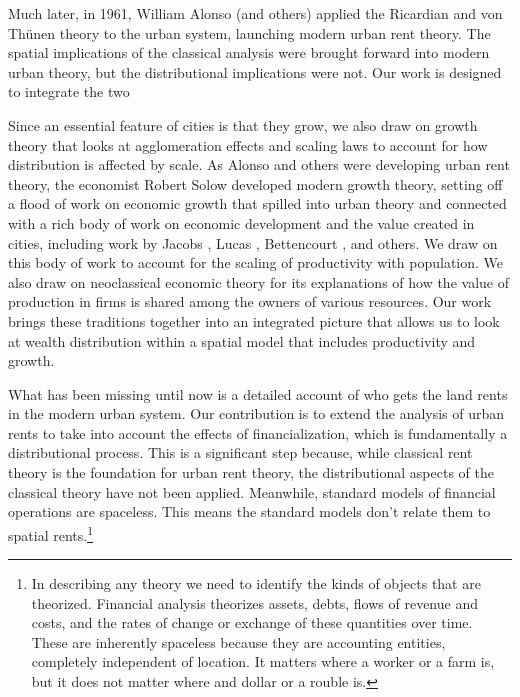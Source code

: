 Much later, in 1961, William Alonso (and others) \cite{alonsoModelUrbanLand1960} applied the Ricardian and von Th\"unen theory to the urban system, launching modern urban rent theory.  The spatial implications of the classical analysis were brought forward into modern urban theory, but the distributional implications were not. Our work is designed to integrate the two

Since an essential feature of cities is that they grow, we also draw on growth theory that looks at agglomeration effects and scaling laws to account for how distribution is affected by scale.  As Alonso and others were developing urban rent theory, the economist Robert Solow \cite{solowContributionTheoryEconomic1956} developed modern growth theory, setting off a flood of work on economic growth that spilled into urban theory and connected with a rich body of work on economic development and the value created in cities, including work by Jacobs \cite{jacobsEconomyCities1969}, Lucas \cite{lucasMechanicsEconomicDevelopment1988}, Bettencourt \cite{bettencourtGrowthInnovationScaling2007}, and others. We draw on this body of work to account for the scaling of productivity with population. We also draw on neoclassical economic theory for its explanations of how the value of production in firms is shared among the owners of various resources. Our work brings these traditions together into an integrated picture that allows us to look at wealth distribution within a spatial model that includes productivity and growth.  

 What has been missing until now is a detailed account of who gets the land rents in the modern urban system. Our contribution is to extend the analysis of urban rents to take into account the effects of financialization, which is fundamentally a distributional process. This is a significant step because, while classical rent theory is the foundation for urban rent theory, the distributional aspects of the classical theory have not been applied. Meanwhile, standard models of financial operations are spaceless. This means the standard models don't relate them to spatial rents.\footnote{In describing any theory we need to identify the kinds of objects that are theorized. Financial analysis theorizes assets, debts, flows of revenue and costs, and the rates of change or exchange of these quantities over time. These are inherently spaceless because they are accounting entities, completely independent of location. It matters where a worker or a farm is, but it does not matter where and dollar or a rouble is.} 
 
